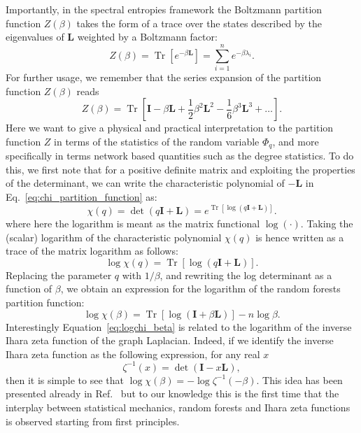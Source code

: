 \documentclass[10pt,aps,pre,twocolumn,nofootinbib,superscriptaddress,longbibliography]{revtex4-1}
\newcommand{\bI}{\mathbf{I}}
\newcommand{\bL}{\mathbf{L}}
\newcommand{\Tr}[1]{\operatorname{Tr}\left\lbrack #1\right\rbrack}
\begin{document}
Importantly, in the spectral entropies framework the Boltzmann partition function $Z(\beta)$ takes the form of a trace over the states described by the eigenvalues of $\bL$ weighted by a Boltzmann factor:
\begin{equation}\label{eq:z}
Z(\beta) = \Tr{e^{-\beta\bL}} = \sum_{i=1}^n e^{-\beta \lambda_i}.
\end{equation}
For further usage, we remember that the series expansion of the partition function $Z(\beta)$ reads
\begin{equation}\label{eq:z_approx}
Z(\beta) = \Tr{\bI - \beta \bL + \frac{1}{2}\beta^2 \bL^2 - \frac{1}{6}\beta^3 \bL^3 + \ldots }.
\end{equation}
Here we want to give a physical and practical interpretation to the partition function $Z$ in terms of the statistics of the random variable $\Phi_q$, and more specifically in terms network based quantities such as the degree statistics.
To do this, we first note that for a positive definite matrix and exploiting the properties of the determinant, we can write the characteristic polynomial of $-\bL$ in Eq.~\ref{eq:chi_partition_function} as:
\begin{equation}
\chi(q) = \det(q\bI + \bL) = e^{\Tr{\log\left(q\bI + \bL \right)}}.
\end{equation}
where here the logarithm is meant as the matrix functional $\log(\cdot)$.
Taking the (scalar) logarithm of the characteristic polynomial $\chi(q)$ is hence written as a trace of the matrix logarithm as follows:
\begin{equation}
\log \chi(q) = \Tr{\log(q \bI + \bL)}.
\end{equation}
Replacing the parameter $q$ with $1/\beta$, and rewriting the log determinant as a function of $\beta$, we obtain an expression for the logarithm of the random forests partition function:
\begin{equation}\label{eq:logchi_beta}
\log \chi \left(\beta\right) = \Tr{\log(\bI + \beta \bL)} - n\log \beta.
\end{equation}
Interestingly Equation~\ref{eq:logchi_beta} is related to the logarithm of the inverse Ihara zeta function of the graph Laplacian.
Indeed, if we identify the inverse Ihara zeta function as the following expression, for any real $x$
\begin{equation}
\zeta^{-1}(x) = \det \left (\bI - x\bL \right),
\end{equation}
then it is simple to see that $\log \chi(\beta) = -\log \zeta^{-1}(-\beta)$.
This idea has been presented already in Ref.~\cite{ye2015} but to our knowledge this is the first time that the interplay between statistical mechanics, random forests and Ihara zeta functions is observed starting from first principles.
\end{document}
